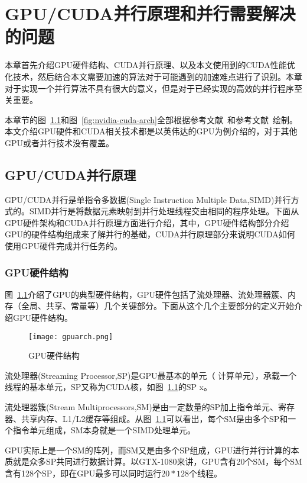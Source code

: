 \chapter{GPU/CUDA并行原理和并行需要解决的问题}
\label{cha:chap03}


本章首先介绍GPU硬件结构、CUDA并行原理、以及本文使用到的CUDA性能优化技术，然后结合本文需要加速的算法对于可能遇到的加速难点进行了识别。本章对于实现一个并行算法不具有很大的意义，但是对于已经实现的高效的并行程序至关重要。

本章节的图~\ref{fig:GPU-HW-Arch}和图~\ref{fig:nvidia-cuda-arch}全部根据参考文献~\cite{nickolls2009graphics}和参考文献~\cite{lippert2009nvidia}绘制。本文介绍GPU硬件和CUDA相关技术都是以英伟达的GPU为例介绍的，对于其他GPU或者并行技术没有覆盖。

\section{GPU/CUDA并行原理}
\label{cha:chap03:gpu-HW-Arch}

GPU/CUDA并行是单指令多数据(Single Instruction Multiple Data,SIMD)并行方式的。SIMD并行是将数据元素映射到并行处理线程交由相同的程序处理。下面从GPU硬件架构和CUDA并行原理方面进行介绍，其中，GPU硬件结构部分介绍GPU的硬件结构组成来了解并行的基础，CUDA并行原理部分来说明CUDA如何使用GPU硬件完成并行任务的。

\subsection{GPU硬件结构}
图~\ref{fig:GPU-HW-Arch}介绍了GPU的典型硬件结构，GPU硬件包括了流处理器、流处理器簇、内存（全局、共享、常量等）几个关键部分。下面从这个几个主要部分的定义开始介绍GPU硬件结构。

\begin{figure}[H] %
	\centering
	\texttt{[image: gpuarch.png]}
	\caption{GPU硬件结构}
	\label{fig:GPU-HW-Arch}
\end{figure}

流处理器(Streaming Processor,SP)是GPU最基本的单元（ 计算单元），承载一个线程的基本单元，SP又称为CUDA核，如图~\ref{fig:GPU-HW-Arch}的SP x。

流处理器簇(Stream Multiprocessors,SM)是由一定数量的SP加上指令单元、寄存器、共享内存、L1/L2缓存等组成。从图~\ref{fig:GPU-HW-Arch}可以看出，每个SM是由多个SP和一个指令单元组成，SM本身就是一个SIMD处理单元。

GPU实际上是一个SM的阵列，而SM又是由多个SP组成，GPU进行并行计算的本质就是众多SP共同进行数据计算。以GTX-1080来讲，GPU含有20个SM，每个SM含有128个SP，即在GPU最多可以同时运行$20*128$个线程。

